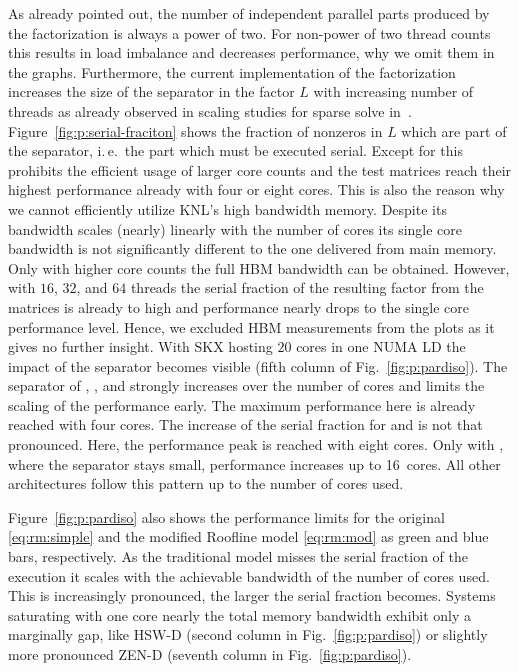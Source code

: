 As already pointed out, the number of independent parallel parts produced by the
factorization is always a power of two.
For non-power of two thread counts this results in load imbalance and decreases
performance, why we omit them in the graphs.
%
Furthermore, the current implementation of the factorization increases the size
of the separator in the factor $L$ with increasing number of threads as already
observed in scaling studies for sparse solve in~\cite{klawonn-2015}.
%
Figure~\ref{fig:p:serial-fraciton} shows the fraction of nonzeros in $L$ which are
part of the separator, i.\,e.\ the part which must be executed serial.
Except for  this prohibits the efficient usage of larger core
counts and the test matrices reach their highest performance already with four
or eight cores.
%
This is also the reason why we cannot efficiently utilize KNL's high bandwidth
memory.
Despite its bandwidth scales (nearly) linearly with the number of cores its
single core bandwidth is not significantly different to the one delivered from
main memory.
Only with higher core counts the full HBM bandwidth can be obtained.
However, with $16$, $32$, and $64$ threads the serial fraction of the resulting
factor from the matrices is already to high and performance nearly drops to
the single core performance level.
Hence, we excluded HBM measurements from the plots as it gives no further
insight.
%
With SKX hosting $20$ cores in one NUMA LD the impact of the separator becomes
visible (fifth column of Fig.~\ref{fig:p:pardiso}).
The separator of , , and \/ strongly increases 
over the number of cores and limits the scaling of the performance early.
The maximum performance here is already reached with four cores.
The increase of the serial fraction for  and  is not
that pronounced.
Here, the performance peak is reached with eight cores.
Only with , where the separator stays small, performance increases
up to 16~cores.
All other architectures follow this pattern up to the number of cores used.

Figure~\ref{fig:p:pardiso} also shows the performance limits for the original
\eqref{eq:rm:simple} and the modified Roofline model \eqref{eq:rm:mod}
as green and blue bars, respectively.
As the traditional model misses the serial fraction of the execution it scales
with the achievable bandwidth of the number of cores used.
This is increasingly pronounced, the larger the serial fraction becomes. 
%
Systems saturating with one core nearly the total memory bandwidth exhibit
only a marginally gap, like HSW-D (second column in Fig.~\ref{fig:p:pardiso}) or
slightly more pronounced ZEN-D (seventh column in Fig.~\ref{fig:p:pardiso}).

